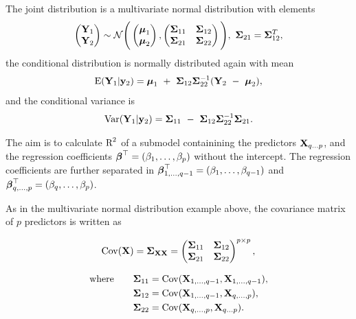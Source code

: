 \documentclass[11pt,a4paper,twoside]{book}\usepackage[]{graphicx}\usepackage[]{color}
\begin{document}
The joint distribution is a multivariate normal distribution with elements
\begin{align*}
\begin{pmatrix}
\mathbf{Y}_{1} \\ 
\mathbf{Y}_{2} \end{pmatrix} \sim \mathcal{N}
\Bigg(\begin{pmatrix}
\boldsymbol{\mu}_{1} \\ 
\boldsymbol{\mu}_{2} 
\end{pmatrix},
\begin{pmatrix}
{\boldsymbol{\Sigma}}{}_{11} & {\boldsymbol{\Sigma}}{}_{12} \\
{\boldsymbol{\Sigma}}{}_{21} & {\boldsymbol{\Sigma}}{}_{22} \\
\end{pmatrix}\Bigg),
\ {\boldsymbol{\Sigma}}{}_{21} = {\boldsymbol{\Sigma}}{}_{12}^{T},
\end{align*}
the conditional distribution is normally distributed again with mean 
\begin{align*}
\E (\mathbf{Y}_{1} | \mathbf{y}_{2} ) = \boldsymbol{\mu}_{1}\ +\ \bSigma_{12} \bSigma_{22}^{-1}(\mathbf{Y}_{2}\ -\ \boldsymbol{\mu}_{2}),
\end{align*}
and the conditional variance is
\begin{align}
\operatorname{Var} ( \mathbf{Y}_{1} | \mathbf{y}_{2} ) = {\boldsymbol{\Sigma}}{}_{11}\ -\ {\boldsymbol{\Sigma}}{}_{12} {\boldsymbol{\Sigma}}{}_{22}^{-1}{\boldsymbol{\Sigma}}{}_{21} \text{.} \label{eq:condvar} 
\end{align}

The aim is to calculate $\text{R}^2$ of a submodel containining the predictors ${\mathbf{X}}_{q...p}$, and the regression coefficients ${\boldsymbol{\beta}}^\top = (\beta_{1}, \dotsc, \beta_{p})$ without the intercept. The regression coefficients are further separated in ${\boldsymbol{\beta}}^\top_{1  ,\dotsc,  q-1} = (\beta_{1} ,\dotsc, \beta_{q-1})$ and ${\boldsymbol{\beta}}^\top_{q ,\dotsc, p} = (\beta_{q} ,\dotsc, \beta_{p})$. 

As in the multivariate normal distribution example above, the covariance matrix of $p$ predictors is written as 

      \begin{align*} 
\operatorname{Cov}({\mathbf{X}}) =	{\boldsymbol{\Sigma}}{}_{{\mathbf{X}} {\mathbf{X}}} = \begin{pmatrix}
{\boldsymbol{\Sigma}}{}_{11} & {\boldsymbol{\Sigma}}{}_{12} \\
{\boldsymbol{\Sigma}}{}_{21} & {\boldsymbol{\Sigma}}{}_{22}  \\
\end{pmatrix}^{p \times p}, 
   \end{align*}
   
         \begin{align*} 
   \text{where} \qquad {\boldsymbol{\Sigma}}{}_{11} &= \operatorname{Cov}({\mathbf{X}}_{1,\dotsc, q-1}, {\mathbf{X}}_{1 ,\dotsc,q-1}), \\ {\boldsymbol{\Sigma}}{}_{12} &= \operatorname{Cov}({\mathbf{X}}_{1,\dotsc, q-1}, {\mathbf{X}}_{q ,\dotsc, p}),\\ {\boldsymbol{\Sigma}}{}_{22} &= \operatorname{Cov}({\mathbf{X}}_{q ,\dotsc, p}, {\mathbf{X}}_{q \dots p}) \text{.} \nonumber
      \end{align*}
      
\end{document}
